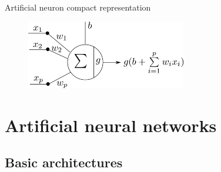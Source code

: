 \documentclass[xcolor=pdftex,dvipsnames,table,mathserif]{beamer}
\begin{document}
\begin{frame}{Artificial neuron compact representation}

    \begin{figure}
      \includegraphics[height=3cm]{../graphics/neurone_representation_compacte}
    \end{figure}

\end{frame}

\section{Artificial neural networks}

\subsection{Basic architectures}

\end{document}
